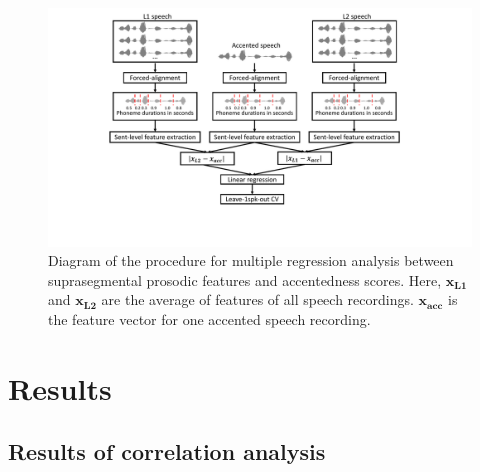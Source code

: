 \begin{figure}[t]
        \begin{minipage}[t]{1.0\linewidth}
        \centering
            \includegraphics[width=5.0in]{figures/method_diagram_supraseg.pdf}
        \end{minipage}%
        \caption{Diagram of the procedure for multiple regression analysis between suprasegmental prosodic features and accentedness scores. Here, $\mathbf{x_{L1}}$ and $\mathbf{x_{L2}}$ are the average of features of all speech recordings. $\mathbf{x_{acc}}$ is the feature vector for one accented speech recording.}
        \centering
        \label{fig:l1_supraseg_diagram}
     \end{figure}

\section{Results}
\subsection{Results of correlation analysis}

